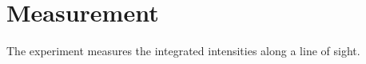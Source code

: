\chapter{\label{ch:measurement}Measurement}

The experiment measures the integrated intensities along a line of sight.







\endinput %